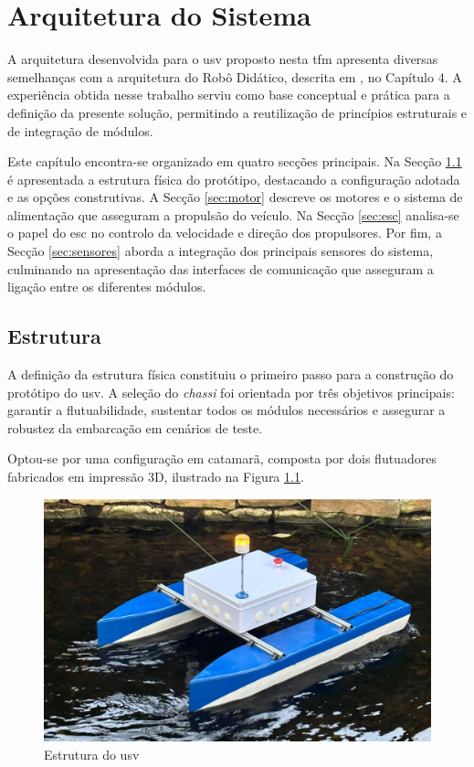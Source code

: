 
\chapter{Arquitetura do Sistema}
\label{ch:arquitetura}

A arquitetura desenvolvida para o \gls{usv} proposto nesta \gls{tfm} apresenta diversas semelhanças com a arquitetura do Robô Didático, descrita em \cite{didactic-robot-thesis}, no Capítulo 4. A experiência obtida nesse trabalho serviu como base conceptual e prática para a definição da presente solução, permitindo a reutilização de princípios estruturais e de integração de módulos.  

Este capítulo encontra-se organizado em quatro secções principais. Na Secção \ref{sec:estrutura} é apresentada a estrutura física do protótipo, destacando a configuração adotada e as opções construtivas. A Secção \ref{sec:motor} descreve os motores e o sistema de alimentação que asseguram a propulsão do veículo. Na Secção \ref{sec:esc} analisa-se o papel do \gls{esc} no controlo da velocidade e direção dos propulsores. Por fim, a Secção \ref{sec:sensores} aborda a integração dos principais sensores do sistema, culminando na apresentação das interfaces de comunicação que asseguram a ligação entre os diferentes módulos.

\section{Estrutura}
\label{sec:estrutura}

A definição da estrutura física constituiu o primeiro passo para a construção do protótipo do \gls{usv}. A seleção do \emph{chassi} foi orientada por três objetivos principais: garantir a flutuabilidade, sustentar todos os módulos necessários e assegurar a robustez da embarcação em cenários de teste. 

Optou-se por uma configuração em catamarã, composta por dois flutuadores fabricados em impressão 3D, ilustrado na Figura \ref{fig:usv-francisco}. 

\begin{figure}[h]
    \centering
    \includegraphics[width=0.5\linewidth]{figuras/usv-francisco.png}
    \caption[Estrutura do \gls{usv}]{Estrutura do \gls{usv} \cite{catamara-telecomandado}}
    \label{fig:usv-francisco}
\end{figure}

